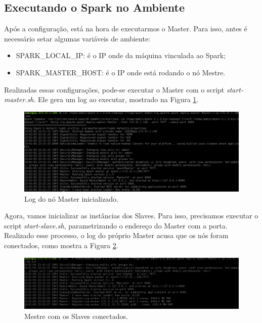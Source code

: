 \documentclass{article}
\begin{document}
\subsection{Executando o Spark no Ambiente}

Após a configuração, está na hora de executarmos o Master. Para isso, antes é necessário setar algumas variáveis de ambiente:


\begin{itemize}
\item SPARK\_LOCAL\_IP: é o IP onde da máquina vinculada ao Spark;
\item SPARK\_MASTER\_HOST: é o IP onde está rodando o nó Mestre.
\end{itemize}

Realizadas essas configurações, pode-se executar o Master com o script \emph{start-master.sh}. Ele gera um log ao executar, mostrado na Figura \ref{fig:spark_log}.

\begin{figure}[h]
  \includegraphics[width=\linewidth]{img/spark_log.png}
  \caption{Log do nó Master inicializado.}
  \label{fig:spark_log}
\end{figure}

Agora, vamos inicializar as instâncias dos Slaves. Para isso, precisamos executar o script \emph{start-slave.sh}, parametrizando o endereço do Master com a porta.
Realizado esse processo, o log do próprio Master acusa que os nós foram conectados, como mostra a Figura \ref{fig:env_ready}.

\begin{figure}[h]
  \includegraphics[width=\linewidth]{img/environment_ready.png}
  \caption{Mestre com os Slaves conectados.}
  \label{fig:env_ready}
\end{figure}
\end{document}
